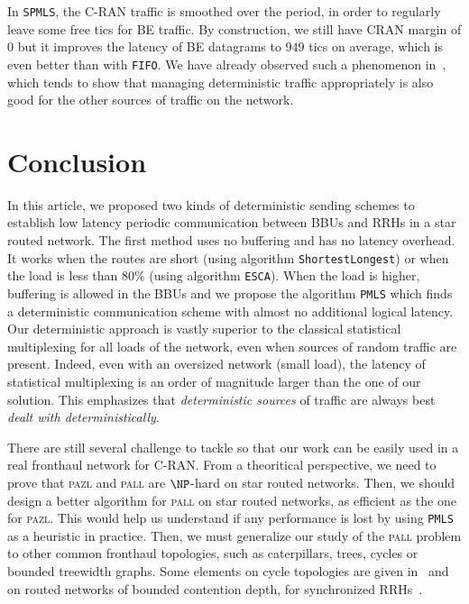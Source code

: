 \documentclass[a4paper,10pt]{article}
\newcommand\shortestlongest{\texttt{ShortestLongest}\xspace}
\newcommand\ESCA{\texttt{ESCA}\xspace}
\newcommand\PMLS{\texttt{PMLS}\xspace}
\newcommand\SPMLS{\texttt{SPMLS}\xspace}
\newcommand\FIFO{\texttt{FIFO}\xspace}
\newcommand\pazl{\textsc{pazl}\xspace}
\newcommand\pall{\textsc{pall}\xspace}
\begin{document}
     In \SPMLS, the C-RAN traffic is smoothed over the period, in order to regularly leave some free tics for BE traffic. By construction, we still have CRAN margin of $0$ but it improves the latency of 
     BE datagrams to $949$ tics on average, which is even better than with \FIFO. 
     We have already observed such a phenomenon in~\cite{DBLP:conf/ondm/BarthGS19}, which tends to show that managing deterministic traffic appropriately is also good for the other sources of traffic on the network.
   


 \section{Conclusion}
 
	In this article, we proposed two kinds of deterministic sending schemes to establish low latency periodic communication between BBUs and RRHs in a star routed network. The first method uses no buffering and has no latency overhead. It works when the routes are short (using algorithm \shortestlongest) or when the load is less than $80\%$ (using algorithm \ESCA).  
	When the load is higher, buffering is allowed in the BBUs and we propose the algorithm \PMLS which finds a deterministic communication scheme with almost no additional logical latency.
 	Our deterministic approach is vastly superior to the classical statistical multiplexing for all loads of the network, even when sources of random traffic are present. Indeed, even with an oversized network (small load), the latency of statistical multiplexing is an order of magnitude larger than the one of our solution. This emphasizes that \emph{deterministic sources} of traffic are always best \emph{dealt with deterministically}.  
    
 	There are still several challenge to tackle so that our work can be easily used in a real 
 	fronthaul network for C-RAN.
  	From a theoritical perspective, we need to prove that \pazl and \pall are $\NP$-hard on star routed networks. Then, we should design a better \FPT algorithm for \pall on star routed networks, as efficient as the one for \pazl. This would help us understand if any performance is lost by using \PMLS as a heuristic in practice. Then, we must generalize our study of the \pall problem to other common fronthaul topologies, such as caterpillars, trees, cycles or bounded treewidth graphs. Some elements on cycle topologies are given in~\cite{DBLP:conf/ondm/BarthGS19} and on routed networks of bounded contention depth, for synchronized RRHs~\cite{guiraud2020synchronized}.
\end{document}

